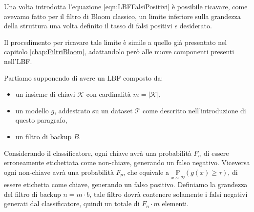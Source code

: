 \documentclass[../../main.tex]{subfiles}
\begin{document}
    Una volta introdotta l'equazione \ref{eqn:LBFFalsiPositivi} è possibile ricavare, come avevamo fatto per il filtro di Bloom classico, un limite inferiore sulla grandezza della struttura una volta definito il tasso di falsi positivi $\epsilon$ desiderato.

    Il procedimento per ricavare tale limite è simile a quello già presentato nel capitolo \ref{chap:FiltriBloom}, adattandolo però alle nuove componenti presenti nell'LBF.

    Partiamo supponendo di avere un LBF composto da: 
    \begin{itemize}
        \item un insieme di chiavi $\mathcal{K}$ con cardinalità $m = |\mathcal{K}|$,
        \item un modello $g$, addestrato su un dataset $\mathcal{T}$ come descritto nell'introduzione di questo paragrafo,
        \item un filtro di backup $B$.
    \end{itemize}
    Considerando il classificatore, ogni chiave avrà una probabilità $F_n$ di essere erroneamente etichettata come non-chiave, generando un falso negativo. Viceversa ogni non-chiave avrà una probabilità $F_p$, che equivale a $\underset{x \sim \mathcal{D}}{\mathbb{P}}(g(x) \geq \tau)$, di essere etichetta come chiave, generando un falso positivo. Definiamo  la grandezza del filtro di backup $n = m \cdot b$, tale filtro dovrà contenere solamente i falsi negativi generati dal classificatore, quindi un totale di $F_n \cdot m$ elementi.
\end{document}
